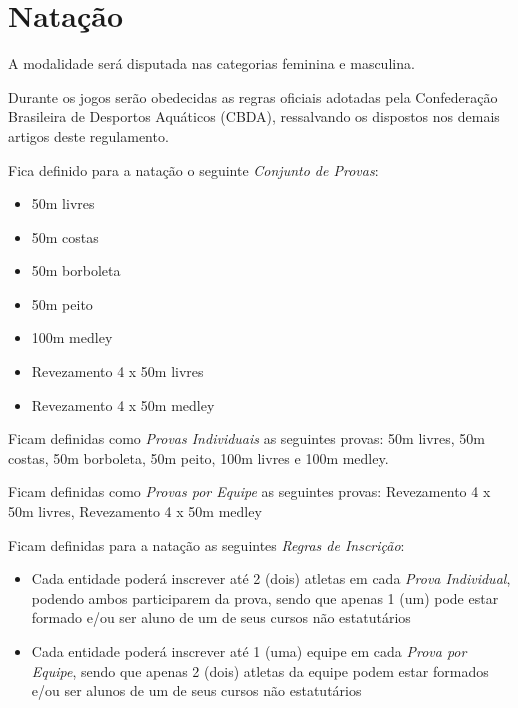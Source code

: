 {\let\clearpage\relax \chapter{Natação}}

\begin{article}
	A modalidade será disputada nas categorias feminina e masculina.
\end{article}

\begin{article}
	Durante os jogos serão obedecidas as regras oficiais adotadas pela Confederação Brasileira de Desportos Aquáticos (CBDA), ressalvando os dispostos nos demais artigos deste regulamento.

	Fica definido para a natação o seguinte \textit{Conjunto de Provas}:
	\begin{itemize}[noitemsep]
		\item 50m livres
		\item 50m costas
		\item 50m borboleta
		\item 50m peito
		\item 100m medley
		\item Revezamento 4 x 50m livres
		\item Revezamento 4 x 50m medley
	\end{itemize}

	\begin{xparagraph}
		Ficam definidas como \textit{Provas Individuais} as seguintes provas: 50m livres, 50m costas, 50m borboleta, 50m peito, 100m livres e 100m medley.
	\end{xparagraph}

	\begin{xparagraph}
		Ficam definidas como \textit{Provas por Equipe} as seguintes provas: Revezamento 4 x 50m livres, Revezamento 4 x 50m medley
	\end{xparagraph}
\end{article}

\noindent
Ficam definidas para a natação as seguintes \textit{Regras de Inscrição}:
\begin{itemize}[noitemsep]
	\item Cada entidade poderá inscrever até 2 (dois) atletas em cada \textit{Prova Individual}, podendo ambos participarem da prova, sendo que apenas 1 (um) pode estar formado e/ou ser aluno de um de seus cursos não estatutários
	\item Cada entidade poderá inscrever até 1 (uma) equipe em cada \textit{Prova por Equipe}, sendo que apenas 2 (dois) atletas da equipe podem estar formados e/ou ser alunos de um de seus cursos não estatutários
\end{itemize}

